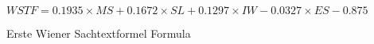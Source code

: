 \begin{figure}[H]
	\caption{Erste Wiener Sachtextformel Formula}
	\label{fig:wst}
	\begin{center}
		\begin{math}
		WSTF = 0.1935 \times MS + 0.1672 \times SL + 0.1297 \times IW - 0.0327 \times ES - 0.875
		\end{math}
	\end{center}
\end{figure}